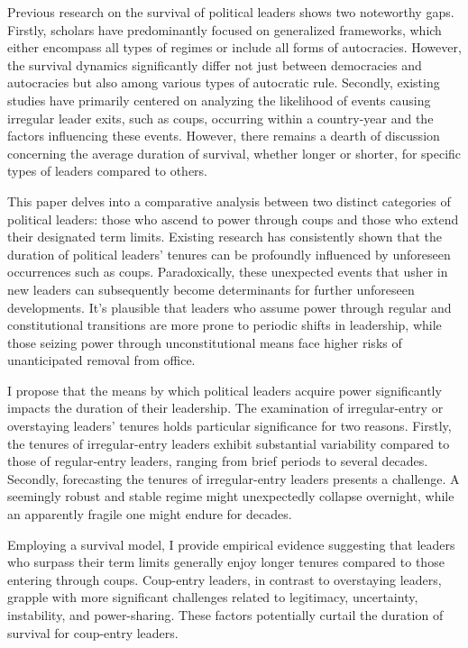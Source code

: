 \documentclass[
  12pt,
  a4paper,
  12pt]{article}
\begin{document}
Previous research on the survival of political leaders shows two
noteworthy gaps. Firstly, scholars have predominantly focused on
generalized frameworks, which either encompass all types of regimes or
include all forms of autocracies. However, the survival dynamics
significantly differ not just between democracies and autocracies but
also among various types of autocratic rule. Secondly, existing studies
have primarily centered on analyzing the likelihood of events causing
irregular leader exits, such as coups, occurring within a country-year
and the factors influencing these events. However, there remains a
dearth of discussion concerning the average duration of survival,
whether longer or shorter, for specific types of leaders compared to
others.

This paper delves into a comparative analysis between two distinct
categories of political leaders: those who ascend to power through coups
and those who extend their designated term limits. Existing research has
consistently shown that the duration of political leaders' tenures can
be profoundly influenced by unforeseen occurrences such as coups.
Paradoxically, these unexpected events that usher in new leaders can
subsequently become determinants for further unforeseen developments.
It's plausible that leaders who assume power through regular and
constitutional transitions are more prone to periodic shifts in
leadership, while those seizing power through unconstitutional means
face higher risks of unanticipated removal from office.

I propose that the means by which political leaders acquire power
significantly impacts the duration of their leadership. The examination
of irregular-entry or overstaying leaders' tenures holds particular
significance for two reasons. Firstly, the tenures of irregular-entry
leaders exhibit substantial variability compared to those of
regular-entry leaders, ranging from brief periods to several decades.
Secondly, forecasting the tenures of irregular-entry leaders presents a
challenge. A seemingly robust and stable regime might unexpectedly
collapse overnight, while an apparently fragile one might endure for
decades.

Employing a survival model, I provide empirical evidence suggesting that
leaders who surpass their term limits generally enjoy longer tenures
compared to those entering through coups. Coup-entry leaders, in
contrast to overstaying leaders, grapple with more significant
challenges related to legitimacy, uncertainty, instability, and
power-sharing. These factors potentially curtail the duration of
survival for coup-entry leaders.
\end{document}
